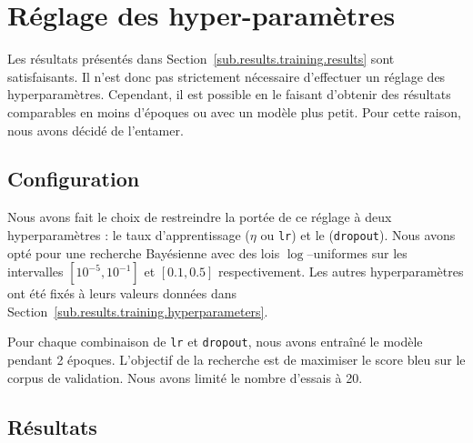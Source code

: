\section{Réglage des hyper-paramètres}%
\label{sec.results.hparams}

Les résultats présentés dans Section~\ref{sub.results.training.results} sont satisfaisants.
Il n'est donc pas strictement nécessaire d'effectuer un réglage des hyperparamètres.
Cependant, il est possible en le faisant d'obtenir des résultats comparables 
en moins d'époques ou avec un modèle plus petit.
Pour cette raison, nous avons décidé de l'entamer.

\subsection{Configuration}%
\label{sub.results.hparams.config}

Nous avons fait le choix de restreindre la portée de ce réglage à deux hyperparamètres :
le taux d'apprentissage (\(\eta\) ou \verb|lr|) et le (\verb|dropout|).
Nous avons opté pour une recherche Bayésienne avec des lois \(\log\)--uniformes sur les intervalles
\(\left[10^{-5}, 10^{-1}\right]\) et \([0.1, 0.5]\) respectivement.
Les autres hyperparamètres ont été fixés à leurs valeurs données dans Section~\ref{sub.results.training.hyperparameters}.

Pour chaque combinaison de \verb|lr| et \verb|dropout|, nous avons entraîné le modèle pendant 2 époques.
L'objectif de la recherche est de maximiser le score \gls{bleu} sur le corpus de validation.
Nous avons limité le nombre d'essais à 20.

\subsection{Résultats}%
\label{sub.results.hparams.results}

